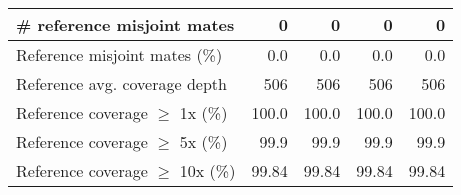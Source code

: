 \documentclass[12pt,a4paper]{article}
\begin{document}
\begin{table}[ht]
\begin{center}
\begin{tabular}{|l*{4}{|r}|}
\# reference misjoint mates & 0 & 0 & 0 & 0 \\ \hline
Reference misjoint mates (\%) & 0.0 & 0.0 & 0.0 & 0.0 \\ \hline
Reference avg. coverage depth & 506 & 506 & 506 & 506 \\ \hline
Reference coverage $\geq$ 1x (\%) & 100.0 & 100.0 & 100.0 & 100.0 \\ \hline
Reference coverage $\geq$ 5x (\%) & 99.9 & 99.9 & 99.9 & 99.9 \\ \hline
Reference coverage $\geq$ 10x (\%) & 99.84 & 99.84 & 99.84 & 99.84 \\ \hline
\end{tabular}
\end{center}
\end{table}
\end{document}
